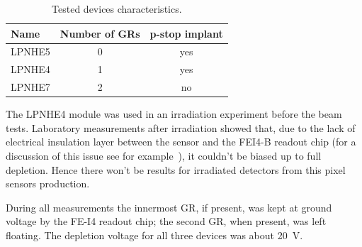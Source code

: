 \begin{table}[!htbp]
\centering
\caption{\label{tab:device_charact}Tested devices characteristics.}
\smallskip
\begin{tabular}{lcc}
\hline
\hline
Name&Number of GRs& p-stop implant\\
\hline
LPNHE5 & 0 & yes\\
LPNHE4 & 1 & yes\\
LPNHE7 & 2 & no\\
\hline
\end{tabular}
\end{table}


The LPNHE4 module was used in an irradiation experiment before the beam tests. Laboratory measurements after irradiation showed that, due to the lack of  electrical insulation layer
between the sensor and the FEI4-B readout chip (for a discussion of this issue see for example~\cite{rossi2006pixel}), it couldn't be biased up to full depletion. Hence there won't be results for irradiated detectors from this pixel sensors production.


During all measurements the innermost GR, if present, was kept at
 ground voltage by the FE-I4 readout chip; the second GR, when present, was left floating. The depletion voltage for all three devices was about 20~V.

